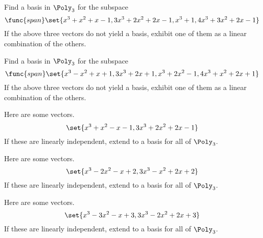 \begin{enumialphparenastyle}
\begin{ex} Find a basis in $\Poly_{3}$ for the subspace 
\begin{equation*}
\func{span}\set{
x^{3}+x^{2}+x-1,3x^{3}+2x^{2}+2x-1,x^{3}+1,4x^{3}+3x^{2}+2x-1}
\end{equation*}
If the above three vectors do not yield a basis, exhibit one
of them as a linear combination of the others.
\end{ex}


\begin{ex} Find a basis in $\Poly_{3}$ for the subspace 
\begin{equation*}
\func{span}\set{
x^{3}-x^{2}+x+1,3x^{3}+2x+1,x^{3}+2x^{2}-1,4x^{3}+x^{2}+2x+1}
\end{equation*}
If the above three vectors do not yield a basis, exhibit one
of them as a linear combination of the others.
\end{ex}


\begin{ex} Here are some vectors.
\begin{equation*}
\set{x^{3}+x^{2}-x-1,3x^{3}+2x^{2}+2x-1}
\end{equation*}
If these are linearly independent, extend to a basis for all of $\Poly_{3}$.
\end{ex}


\begin{ex} Here are some vectors.
\begin{equation*}
\set{x^{3}-2x^{2}-x+2,3x^{3}-x^{2}+2x+2}
\end{equation*}
If these are linearly independent, extend to a basis for all of $\Poly_{3}$.
\end{ex}


\begin{ex} Here are some vectors.
\begin{equation*}
\set{x^{3}-3x^{2}-x+3,3x^{3}-2x^{2}+2x+3}
\end{equation*}
If these are linearly independent, extend to a basis for all of $\Poly_{3}$.
\end{ex}



\end{enumialphparenastyle}
